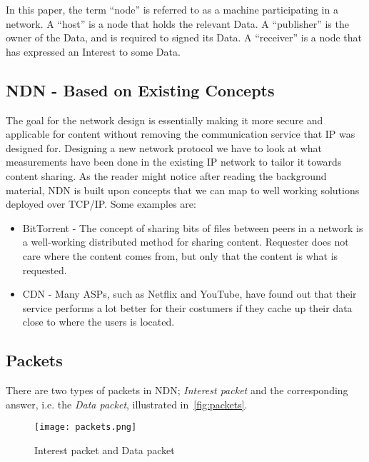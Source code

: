 In this paper, the term ``node'' is referred to as a machine participating in a network.
A ``host'' is a node that holds the relevant Data.
A ``publisher'' is the owner of the Data, and is required to signed its Data.
A ``receiver'' is a node that has expressed an Interest to some Data.

\subsection{NDN - Based on Existing Concepts}
The goal for the network design is essentially making it more secure and applicable for content without removing the communication service that \gls{IP} was designed for. 
Designing a new network protocol we have to look at what measurements have been done in the existing \gls{IP} network to tailor it towards content sharing.
As the reader might notice after reading the background material, \gls{NDN} is built upon concepts that we can map to well working solutions deployed over \gls{TCP}/\gls{IP}.
Some examples are:
\begin{itemize}
  \item BitTorrent - 
  The concept of sharing bits of files between peers in a network is a well-working distributed method for sharing content. 
  Requester does not care where the content comes from, but only that the content is what is requested.
  \item \gls{CDN} - 
  Many \gls{ASP}s, such as Netflix and YouTube, have found out that their service performs a lot better for their costumers if they cache up their data close to where the users is located.
\end{itemize}

\subsection{Packets}\label{packets}
There are two types of packets in \gls{NDN};
\textit{Interest packet} and the corresponding answer, i.e. the \textit{Data packet}, illustrated in~\autoref{fig:packets}.

\begin{figure}[H]
  \centering
  \texttt{[image: packets.png]}
  \caption{Interest packet and Data packet}
  \label{fig:packets}
\end{figure}

